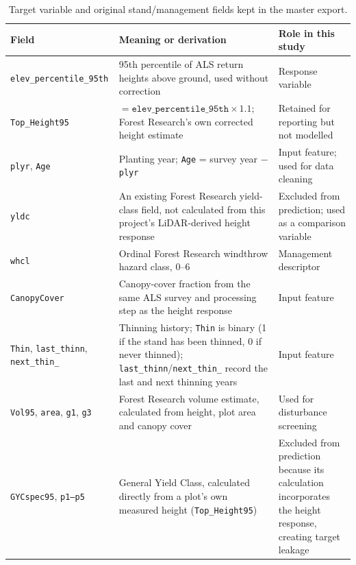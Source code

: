 \begin{table}[!htbp]
\scriptsize
\setlength{\tabcolsep}{3pt}
\renewcommand{\arraystretch}{0.95}
\begin{tabular}{p{2.6cm}p{7.0cm}p{3.2cm}}
\hline
Field & Meaning or derivation & Role in this study \\
\hline
\texttt{elev\_percentile\_95th} & 95th percentile of ALS return heights above ground, used without correction & Response variable \\
\texttt{Top\_Height95} & $=\texttt{elev\_percentile\_95th}\times1.1$; Forest Research's own corrected height estimate & Retained for reporting but not modelled \\
\texttt{plyr}, \texttt{Age} & Planting year; \texttt{Age} = survey year $-$ \texttt{plyr} & Input feature; used for data cleaning \\
\texttt{yldc} & An existing Forest Research yield-class field, not calculated from this project's LiDAR-derived height response & Excluded from prediction; used as a comparison variable \\
\texttt{whcl} & Ordinal Forest Research windthrow hazard class, 0--6 & Management descriptor \\
\texttt{CanopyCover} & Canopy-cover fraction from the same ALS survey and processing step as the height response & Input feature \\
\texttt{Thin}, \texttt{last\_thinn}, \texttt{next\_thin\_} & Thinning history; \texttt{Thin} is binary (1 if the stand has been thinned, 0 if never thinned); \texttt{last\_thinn}/\texttt{next\_thin\_} record the last and next thinning years & Input feature \\
\texttt{Vol95}, \texttt{area}, \texttt{g1}, \texttt{g3} & Forest Research volume estimate, calculated from height, plot area and canopy cover & Used for disturbance screening \\
\texttt{GYCspec95}, \texttt{p1--p5} & General Yield Class, calculated directly from a plot's own measured height (\texttt{Top\_Height95}) \ct{Forest Research, "Use of Airborne Laser Scanning (ALS) for Forest Inventory" -- source of p1--p5, full reference not yet confirmed} & Excluded from prediction because its calculation
incorporates the height response, creating target leakage \\
\hline
\end{tabular}
\caption{Target variable and original stand/management fields kept in the master export.}
\label{tab:data-fields}
\end{table}
